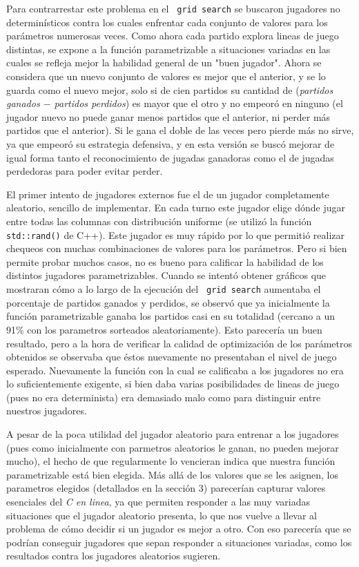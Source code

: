 \documentclass[A4paper,oneside,fleqn,11pt]{article}
\theoremstyle{definition}
\begin{document}
Para contrarrestar este problema en el \texttt{ grid search} se buscaron jugadores no determinísticos contra los cuales enfrentar cada conjunto de valores para los parámetros numerosas veces. Como ahora cada partido explora lineas de juego distintas, se expone a la función parametrizable a situaciones variadas en las cuales se refleja mejor la habilidad general de un "buen jugador". Ahora se considera que un nuevo conjunto de valores es mejor que el anterior, y se lo guarda como el nuevo mejor, solo si de cien partidos su cantidad de (\textit{partidos ganados $-$ partidos perdidos}) es mayor que el otro y no empeoró en ninguno (el jugador nuevo no puede ganar menos partidos que el anterior, ni perder más partidos que el anterior). Si le gana el doble de las veces pero pierde más no sirve, ya que empeoró su estrategia defensiva, y en esta versión se buscó mejorar de igual forma tanto el reconocimiento de jugadas ganadoras como el de jugadas perdedoras para poder evitar perder. 

El primer intento de jugadores externos fue el de un jugador completamente aleatorio, sencillo de implementar. En cada turno este jugador elige dónde jugar entre todas las columnas con distribución uniforme (se utilizó la función\texttt{ std::rand()} de C++). Este jugador es muy rápido por lo que permitió realizar chequeos con muchas combinaciones de valores para los parámetros. Pero si bien permite probar muchos casos, no es bueno para calificar la habilidad de los distintos jugadores parametrizables. Cuando se intentó obtener gráficos que mostraran cómo a lo largo de la ejecución del \texttt{ grid search} aumentaba el porcentaje de partidos ganados y perdidos, se observó que ya inicialmente la función parametrizable ganaba los partidos casi en su totalidad (cercano a un 91\% con los parametros sorteados aleatoriamente). Esto parecería un buen resultado, pero a la hora de verificar la calidad de optimización de los parámetros obtenidos se observaba que éstos nuevamente no presentaban el nivel de juego esperado. Nuevamente la función con la cual se calificaba a los jugadores no era lo suficientemente exigente, si bien daba varias posibilidades de lineas de juego (pues no era determinista) era demasiado malo como para distinguir entre nuestros jugadores. 

A pesar de la poca utilidad del jugador aleatorio para entrenar a los jugadores (pues como inicialmente con parmetros aleatorios le ganan, no pueden mejorar mucho), el hecho de que regularmente lo vencieran indica que nuestra función parametrizable está bien elegida. Más allá de los valores que se les asignen, los parametros elegidos (detallados en la sección 3) parecerían capturar valores esenciales del \textit{C en linea}, ya que permiten responder a las muy variadas situaciones que el jugador aleatorio presenta, lo que nos vuelve a llevar al problema de cómo decidir si un jugador es mejor a otro. Con eso parecería que se podrían conseguir jugadores que sepan responder a situaciones variadas, como los resultados contra los jugadores aleatorios sugieren.
\end{document}
